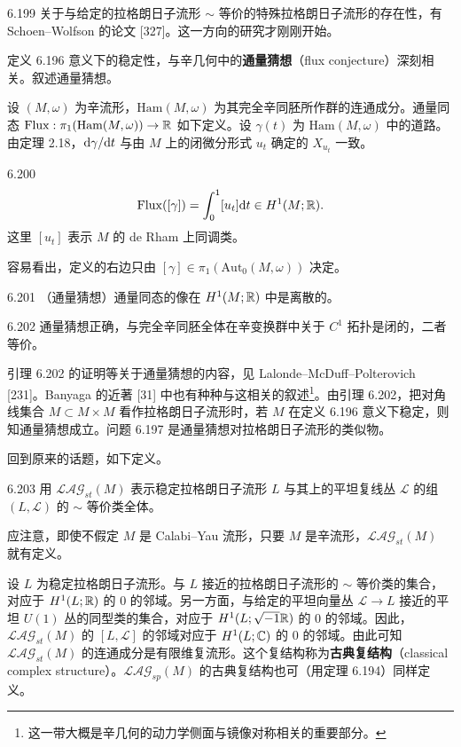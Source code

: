 \begin{remark}{6.199}
  关于与给定的拉格朗日子流形 $\sim$ 等价的特殊拉格朗日子流形的存在性，有 Schoen–Wolfson 的论文 [327]。这一方向的研究才刚刚开始。
\end{remark}

定义 6.196 意义下的稳定性，与辛几何中的\textbf{通量猜想}（flux conjecture）深刻相关。叙述通量猜想。

设 $(M,\omega)$ 为辛流形，$\mathrm{Ham}(M,\omega)$ 为其完全辛同胚所作群的连通成分。通量同态 $\mathrm{Flux}:\pi_1(\mathrm{Ham}(M,\omega))\to\mathbb{R}$ 如下定义。设 $\gamma(t)$ 为 $\mathrm{Ham}(M,\omega)$ 中的道路。由定理 2.18，$\mathrm{d}\gamma/\mathrm{d} t$ 与由 $M$ 上的闭微分形式 $u_t$ 确定的 $X_{u_t}$ 一致。

\begin{definition}{6.200}
  \[
    \mathrm{Flux}([\gamma])=\int_0^1[u_t]\mathrm{d} t\in H^1(M;\mathbb{R}).
  \]
  这里 $[u_t]$ 表示 $M$ 的 de Rham 上同调类。
\end{definition}

容易看出，定义的右边只由 $[\gamma]\in\pi_1(\mathrm{Aut}_0(M,\omega))$ 决定。

\begin{conjecture}{6.201}
  （通量猜想）通量同态的像在 $H^1(M;\mathbb{R})$ 中是离散的。
\end{conjecture}

\begin{lemma}{6.202}
  通量猜想正确，与完全辛同胚全体在辛变换群中关于 $C^1$ 拓扑是闭的，二者等价。
\end{lemma}

引理 6.202 的证明等关于通量猜想的内容，见 Lalonde–McDuff–Polterovich [231]。Banyaga 的近著 [31] 中也有种种与这相关的叙述\footnote{这一带大概是辛几何的动力学侧面与镜像对称相关的重要部分。}。由引理 6.202，把对角线集合 $M\subset M\times M$ 看作拉格朗日子流形时，若 $M$ 在定义 6.196 意义下稳定，则知通量猜想成立。问题 6.197 是通量猜想对拉格朗日子流形的类似物。

回到原来的话题，如下定义。

\begin{definition}{6.203}
  用 $\mathcal{LAG}_{st}(M)$ 表示稳定拉格朗日子流形 $L$ 与其上的平坦复线丛 $\mathcal L$ 的组 $(L,\mathcal L)$ 的 $\sim$ 等价类全体。
\end{definition}

应注意，即使不假定 $M$ 是 Calabi–Yau 流形，只要 $M$ 是辛流形，$\mathcal{LAG}_{st}(M)$ 就有定义。

设 $L$ 为稳定拉格朗日子流形。与 $L$ 接近的拉格朗日子流形的 $\sim$ 等价类的集合，对应于 $H^1(L;\mathbb{R})$ 的 $0$ 的邻域。另一方面，与给定的平坦向量丛 $\mathcal L\to L$ 接近的平坦 $U(1)$ 丛的同型类的集合，对应于 $H^1(L;\sqrt{-1}\mathbb{R})$ 的 $0$ 的邻域。因此，$\mathcal{LAG}_{st}(M)$ 的 $[L,\mathcal L]$ 的邻域对应于 $H^1(L;\mathbb{C})$ 的 $0$ 的邻域。由此可知 $\mathcal{LAG}_{st}(M)$ 的连通成分是有限维复流形。这个复结构称为\textbf{古典复结构}（classical complex structure）。$\mathcal{LAG}_{sp}(M)$ 的古典复结构也可（用定理 6.194）同样定义。

